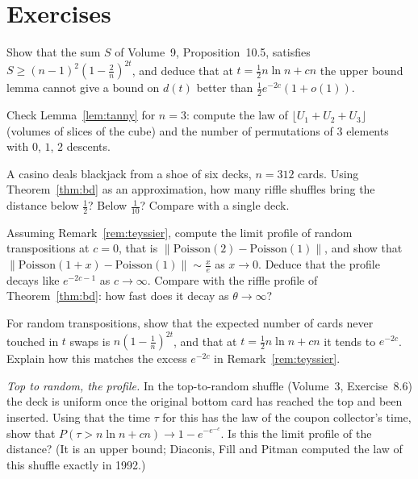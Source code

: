 \section{Exercises}

\begin{exercise}[$\star$]\label{ex:lemmalimit}
Show that the sum $S$ of Volume~9, Proposition~10.5, satisfies $S\ge(n-1)^2(1-\frac2n)^{2t}$, and deduce that at $t=\frac12n\ln n+cn$ the upper bound lemma cannot give a bound on $d(t)$
better than $\frac12e^{-2c}(1+o(1))$.
\end{exercise}

\begin{exercise}[$\star$]\label{ex:tannysmall}
Check Lemma~\ref{lem:tanny} for $n=3$: compute the law of $\lfloor U_1+U_2+U_3\rfloor$ (volumes of slices of the cube) and the number of permutations of $3$ elements with $0$, $1$, $2$ descents.
\end{exercise}

\begin{exercise}[$\star\star$]\label{ex:shoe}
A casino deals blackjack from a shoe of six decks, $n=312$ cards. Using Theorem~\ref{thm:bd} as an approximation, how many riffle shuffles bring the distance below
$\frac12$? Below $\frac1{10}$? Compare with a single deck.
\end{exercise}

\begin{exercise}[$\star\star$]\label{ex:profile}
Assuming Remark~\ref{rem:teyssier}, compute the limit profile of random transpositions at $c=0$, that is $\|\mathrm{Poisson}(2)-\mathrm{Poisson}(1)\|$, and show that
$\|\mathrm{Poisson}(1+x)-\mathrm{Poisson}(1)\|\sim\frac x{e}$ as $x\to0$. Deduce that the profile decays like $e^{-2c-1}$ as $c\to\infty$. Compare with the riffle profile of Theorem~\ref{thm:bd}: how fast does
it decay as $\theta\to\infty$?
\end{exercise}

\begin{exercise}[$\star\star$]\label{ex:untouched}
For random transpositions, show that the expected number of cards never touched in $t$ swaps is $n(1-\frac1n)^{2t}$, and that at $t=\frac12n\ln n+cn$ it tends to $e^{-2c}$. Explain how this
matches the excess $e^{-2c}$ in Remark~\ref{rem:teyssier}.
\end{exercise}

\begin{exercise}[$\star\star\star$]\label{ex:topinsert}
\emph{Top to random, the profile.} In the top-to-random shuffle (Volume~3, Exercise~8.6) the deck is uniform once the original bottom card has reached the top and been
inserted. Using that the time $\tau$ for this has the law of the coupon collector's time, show that $P(\tau>n\ln n+cn)\to1-e^{-e^{-c}}$. Is this the limit profile of the distance?
(It is an upper bound; Diaconis, Fill and Pitman computed the law of this shuffle exactly in 1992.)
\end{exercise}

